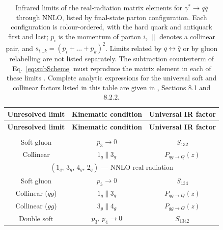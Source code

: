 {
    \footnotesize
    \renewcommand{\arraystretch}{1.3}
    \begin{longtable}{|c|c|c|}
        \caption{\centering Infrared limits of the real-radiation matrix elements for
        $\gamma^*\to q\bar q$ through NNLO, listed by final-state parton configuration.
        Each configuration is colour-ordered, with the hard quark and antiquark first and
        last; $p_i$ is the momentum of parton $i$, $\parallel$ denotes a collinear pair, and
        $s_{i\ldots k}=(p_i+\ldots+p_k)^2$. Limits related by $q\leftrightarrow\bar q$ or by
        gluon relabelling are not listed separately. The subtraction counterterm of
        Eq.~\eqref{eq:subScheme} must reproduce the matrix element in each of these limits
        \cite{Gehrmann-DeRidder:2005btv}. Complete analytic expressions for the universal
        soft and collinear factors listed in this table are given in \cite{Gehrmann-DeRidder:2005btv},
        Sections 8.1 and 8.2.2.}\label{tab:limits}\\
        \hline
        \textbf{Unresolved limit} & \textbf{Kinematic condition} & \textbf{Universal IR factor} \\
        \hline
        \endfirsthead
        \hline
        \textbf{Unresolved limit} & \textbf{Kinematic condition} & \textbf{Universal IR factor} \\
        \hline
        \endhead
        \hline
        \endfoot
        \hline
        \endlastfoot
        \multicolumn{3}{|c|}{$(1_q,\,3_g,\,2_{\bar q})$ --- NLO real radiation} \\
        \hline
        Soft gluon              & $p_3\to 0$                                  & $S_{132}$ \\
        \hline
        Collinear               & $1_q\parallel3_g$                          & $P_{qg\to Q}(z)$ \\
        \hline
        \multicolumn{3}{|c|}{$(1_q,\,3_g,\,4_g,\,2_{\bar q})$ --- NNLO real radiation} \\
        \hline
        Soft gluon              & $p_3\to0$                                  & $S_{134}$ \\
        \hline
        Collinear ($qg$)        & $1_q\parallel3_g$                          & $P_{qg\to Q}(z)$ \\
        \hline
        Collinear ($gg$)        & $3_g\parallel4_g$                          & $P_{gg\to G}(z)$ \\
        \hline
        Double soft             & $p_3,\,p_4\to0$                            & $S_{1342}$ \\

\end{longtable}}
